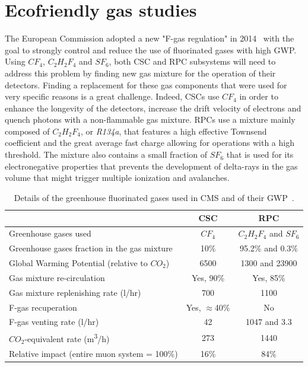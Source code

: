 \section{Ecofriendly gas studies}
\label{chapt3:sec:EcoGas}

	The European Commission adopted a new "F-gas regulation" in 2014~\cite{EUFGAS2014} with the goal to strongly control and reduce the use of fluorinated gases with high \acf{GWP}. Using $CF_4$, $C_2H_2F_4$ and $SF_6$, both CSC and RPC subsystems will need to address this problem by finding new gas mixture for the operation of their detectors. Finding a replacement for these gas components that were used for very specific reasons is a great challenge. Indeed, CSCs use $CF_4$ in order to enhance the longevity of the detectors, increase the drift velocity of electrons and quench photons with a non-flammable gas mixture. RPCs use a mixture mainly composed of $C_2H_2F_4$, or \textit{R134a}, that features a high effective Townsend coefficient and the great average fast charge allowing for operations with a high threshold. The mixture also contains a small fraction of $SF_6$ that is used for its electronegative properties that prevents the development of delta-rays in the gas volume that might trigger multiple ionization and avalanches.
	
	\begin{table}[H]
		\centering
		\begin{tabular}{l c c}
			\hline
			 & CSC & RPC\\
			\hline
			Greenhouse gases used & $CF_4$ & $C_2H_2F_4$ and $SF_6$ \\
			Greenhouse gases fraction in the gas mixture & 10\% & 95.2\% and 0.3\% \\
			Global Warming Potential (relative to $CO_2$) & 6500 & 1300 and 23900 \\
			Gas mixture re-circulation & Yes, 90\% & Yes, 85\% \\
			Gas mixture replenishing rate (\si{l/hr}) & 700 & 1100 \\
			F-gas recuperation & Yes, $\approx$40\% & No \\
			F-gas venting rate (\si{l/hr}) & 42 & 1047 and 3.3 \\
			$CO_2$-equivalent rate (\si{m^3/h}) & 273 & 1440 \\
			Relative impact (entire muon system = 100\%) & 16\% & 84\% \\
			\hline
		\end{tabular}
		\caption{\label{tab:F-GAS-CMS} Details of the greenhouse fluorinated gases used in CMS and of their GWP~\cite{PHASEIITP}.}
	\end{table}
	
